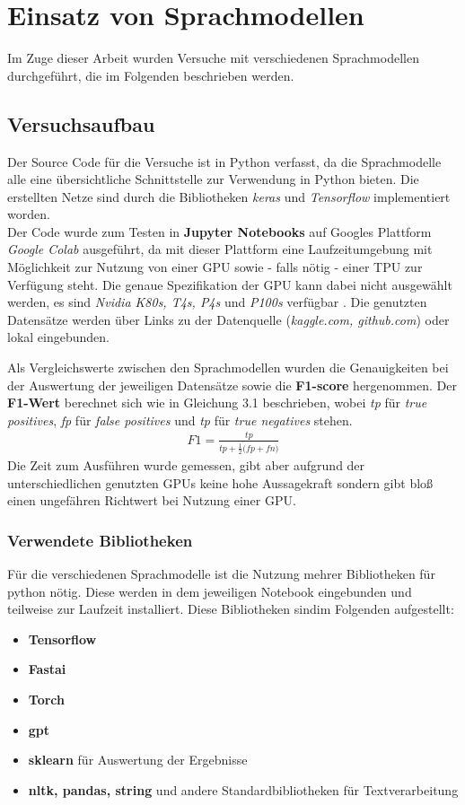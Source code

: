 \chapter{Einsatz von Sprachmodellen}
Im Zuge dieser Arbeit wurden Versuche mit verschiedenen Sprachmodellen durchgef\"uhrt, die im Folgenden beschrieben werden.

\section{Versuchsaufbau}
Der Source Code f\"ur die Versuche ist in Python verfasst, da die Sprachmodelle alle eine \"ubersichtliche Schnittstelle zur Verwendung in Python bieten. Die erstellten Netze sind durch die Bibliotheken \textit{keras} \cite{keras} und \textit{Tensorflow} \cite{tensorflow} implementiert worden. \\
Der Code wurde zum Testen in \textbf{Jupyter Notebooks} auf Googles Plattform \textit{Google Colab} \cite{colab} ausgef\"uhrt, da mit dieser Plattform eine Laufzeitumgebung mit M\"oglichkeit zur Nutzung von einer GPU sowie - falls n\"otig - einer TPU zur Verf\"ugung steht. Die genaue Spezifikation der GPU kann dabei nicht ausgew\"ahlt werden, es sind \textit{Nvidia K80s, T4s, P4s} und \textit{P100s} verf\"ugbar \cite{colab_gpu}. Die genutzten Datens\"atze werden \"uber Links zu der Datenquelle (\textit{kaggle.com, github.com}) oder lokal eingebunden.

Als Vergleichswerte zwischen den Sprachmodellen wurden die Genauigkeiten bei der Auswertung der jeweiligen Datens\"atze sowie die \textbf{F1-score} hergenommen. Der \textbf{F1-Wert} berechnet sich wie in Gleichung 3.1 beschrieben, wobei \textit{tp} f\"ur \textit{true positives}, \textit{fp} f\"ur \textit{false positives} und \textit{tp} f\"ur \textit{true negatives} stehen.
\begin{align}
   F1 {=} \frac{tp}{tp + \frac{1}{2} \dot (fp + fn)}
\end{align}
Die Zeit zum Ausf\"uhren wurde gemessen, gibt aber aufgrund der unterschiedlichen genutzten GPUs keine hohe Aussagekraft sondern gibt blo{\ss} einen ungef\"ahren Richtwert bei Nutzung einer GPU.

\subsection{Verwendete Bibliotheken}
F\"ur die verschiedenen Sprachmodelle ist die Nutzung mehrer Bibliotheken f\"ur python n\"otig. Diese werden in dem jeweiligen Notebook eingebunden und teilweise zur Laufzeit installiert. Diese Bibliotheken sindim Folgenden aufgestellt:
\begin{itemize}
\item \textbf{Tensorflow}
\item \textbf{Fastai}
\item \textbf{Torch}
\item \textbf{gpt}
\item \textbf{sklearn} f\"ur Auswertung der Ergebnisse
\item \textbf{nltk, pandas, string} und andere Standardbibliotheken f\"ur Textverarbeitung 
\end{itemize}

